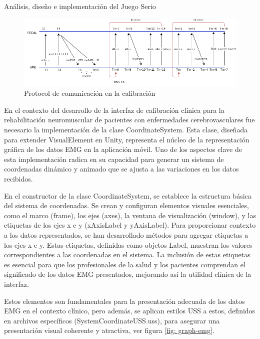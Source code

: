 \begin{thesischapter}{2} {Análisis, diseño e implementación del Juego Serio}
    
    \begin{figure}[ht]
        \centering
        \includegraphics[scale=0.58]{images/diagram-protocol-in-calibration.png}
        \caption{Protocol de comunicación en la calibración}
        \label{fig: diagram-protocol-in-calibration}
    \end{figure}

    En el contexto del desarrollo de la interfaz de calibración clínica para la rehabilitación neuromuscular de pacientes con enfermedades cerebrovasculares
    fue necesario la implementación de la clase CoordinateSystem. Esta clase, diseñada para extender VisualElement en Unity, representa el núcleo de la representación 
    gráfica de los datos EMG en la aplicación móvil. Uno de los aspectos clave de esta implementación 
    radica en su capacidad para generar un sistema de coordenadas dinámico y animado que se ajusta a las variaciones en los datos recibidos.

    \vspace{10pt}
    En el constructor de la clase CoordinateSystem, se establece la estructura básica del sistema de coordenadas. Se crean y configuran elementos visuales esenciales, como el 
    marco (frame), los ejes (axes), la ventana de visualización (window), y las etiquetas de los ejes x e y (xAxisLabel y yAxisLabel). Para proporcionar contexto a los datos 
    representados, se han desarrollado métodos para agregar etiquetas a los ejes x e y. Estas etiquetas, definidas como objetos Label, muestran los 
    valores correspondientes a las coordenadas en el sistema. La inclusión de estas etiquetas es esencial para que los profesionales de la salud y los pacientes 
    comprendan el significado de los datos EMG presentados, mejorando así la utilidad clínica de la interfaz. 
    
    \vspace{5pt}
    Estos elementos son fundamentales para la presentación adecuada de los datos EMG en el contexto clínico, pero además, se aplican estilos USS a estos, definidos en archivos específicos (SystemCoordinateUSS.uss), para asegurar una 
    presentación visual coherente y atractiva, ver figura \ref{fig: graph-emg}.


\end{thesischapter}
